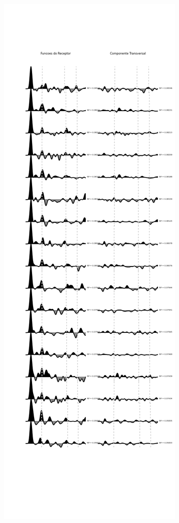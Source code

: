 \begin{figure}[!ht]
\centering
\includegraphics[scale=0.35]{RF_SLP01.png}
\caption{}
\label{RF_SLP01}
\end{figure}


